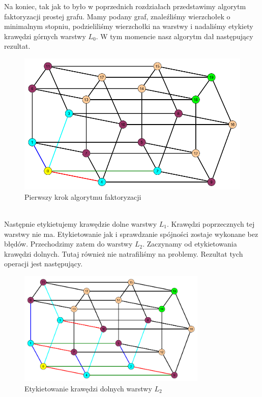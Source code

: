 \documentclass[12pt,a4paper,titlepage]{article}
\newcommand\tab[1][1cm]{\hspace*{#1}}
\begin{document}
\newpage
Na koniec, tak jak to było w poprzednich rozdziałach przedstawimy algorytm faktoryzacji prostej grafu. Mamy podany graf, znaleźliśmy wierzchołek o minimalnym stopniu, podzieliliśmy wierzchołki na warstwy i nadaliśmy etykiety krawędzi górnych warstwy $L_0$. W tym momencie nasz algorytm dał następujący rezultat.\\
\begin{figure}[h]
\centering
\includegraphics[width = 15cm]{fak1.png}
\caption{Pierwszy krok algorytmu faktoryzacji}
\end{figure}
\\
\tab[0.6cm]Następnie etykietujemy krawędzie dolne warstwy $L_1$. Krawędzi poprzecznych tej warstwy nie ma. Etykietowanie jak i sprawdzanie spójności zostaje wykonane bez błędów. Przechodzimy zatem do warstwy $L_2$. Zaczynamy od etykietowania krawędzi dolnych. Tutaj również nie natrafiliśmy na problemy. Rezultat tych operacji jest następujący.\\
\begin{figure}[h]
\centering
\includegraphics[width = 9cm]{fak2.png}
\caption{Etykietowanie krawędzi dolnych warstwy $L_2$}
\end{figure}
\\
\\
\end{document}
